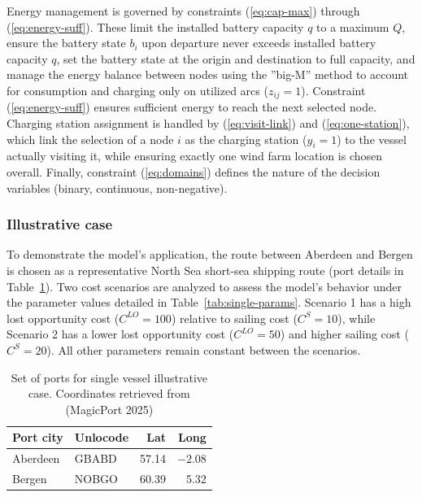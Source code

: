 Energy management is governed by constraints (\ref{eq:cap-max}) through (\ref{eq:energy-suff}). These limit the installed battery capacity $q$ to a maximum $Q$, ensure the battery state $b_{i}$ upon departure never exceeds installed battery capacity $q$, set the battery state at the origin and destination to full capacity, and manage the energy balance between nodes using the ''big-M'' method to account for consumption and charging only on utilized arcs ($z_{ij}=1$). Constraint (\ref{eq:energy-suff}) ensures sufficient energy to reach the next selected node. Charging station assignment is handled by (\ref{eq:visit-link}) and (\ref{eq:one-station}), which link the selection of a node $i$ as the charging station ($y_{i}=1$) to the vessel actually visiting it, while ensuring exactly one wind farm location is chosen overall. Finally, constraint (\ref{eq:domains}) defines the nature of the decision variables (binary, continuous, non-negative).

\subsubsection{Illustrative case}
\label{sec:single-case}

To demonstrate the model's application, the route between Aberdeen and Bergen is chosen as a representative North Sea short-sea shipping route (port details in Table~\ref{tab:single-ports}). Two cost scenarios are analyzed to assess the model's behavior under the parameter values detailed in Table~\ref{tab:single-params}. Scenario 1 has a high lost opportunity cost ($C^{LO}=100$) relative to sailing cost ($C^{S}=10$), while Scenario 2 has a lower lost opportunity cost ($C^{LO}=50$) and higher sailing cost ($C^{S}=20$). All other parameters remain constant between the scenarios.

\begin{table}[H]
\centering
\caption{Set of ports for single vessel illustrative case. Coordinates retrieved from (MagicPort 2025)}
\label{tab:single-ports}
\begin{tabular}{@{}llrr@{}}
\toprule
Port city & Unlocode & Lat & Long \\
\midrule
Aberdeen & GBABD & 57.14 & $-2.08$ \\
Bergen   & NOBGO & 60.39 & 5.32 \\
\bottomrule
\end{tabular}
\end{table}


